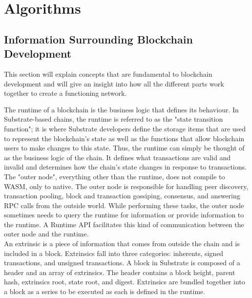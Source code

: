 \let\textcircled=\pgftextcircled
\chapter{Algorithms}
\renewcommand{\ttdefault}{pcr}

\section{Information Surrounding Blockchain Development}

This section will explain concepts that are fundamental to blockchain development and will give an insight into how all the different parts work together to create a functioning network.

The runtime of a blockchain is the business logic that defines its behaviour. In Substrate-based chains, the runtime is referred to as the "state transition function"; it is where Substrate developers define the storage items that are used to represent the blockchain's state as well as the functions that allow blockchain users to make changes to this state. Thus, the runtime can simply be thought of as the business logic of the chain. It defines what transactions are valid and invalid and determines how the chain's state changes in response to transactions.\\

The "outer node", everything other than the runtime, does not compile to WASM, only to native. The outer node is responsible for handling peer discovery, transaction pooling, block and transaction gossiping, consensus, and answering RPC calls from the outside world. While performing these tasks, the outer node sometimes needs to query the runtime for information or provide information to the runtime. A Runtime API facilitates this kind of communication between the outer node and the runtime. \\

An extrinsic is a piece of information that comes from outside the chain and is included in a block. Extrinsics fall into three categories: inherents, signed transactions, and unsigned transactions. A block in Substrate is composed of a header and an array of extrinsics. The header contains a block height, parent hash, extrinsics root, state root, and digest.  Extrinsics are bundled together into a block as a series to be executed as each is defined in the runtime. \\

